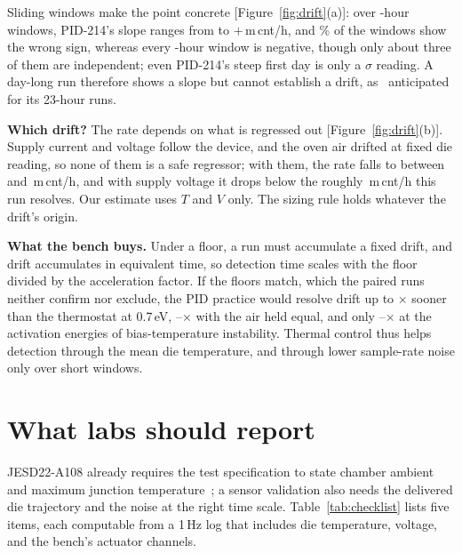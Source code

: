 \documentclass[10pt,twocolumn]{article}
\newcommand{\mcnth}{\,m\,cnt/h}
\begin{document}
Sliding windows make the point concrete [Figure~\ref{fig:drift}(a)]: over \vWinLenMid-hour windows, PID-214's slope ranges from \vWinMinMid{} to $+$\vWinMaxMid\mcnth, and \vWinPosMid\% of the windows show the wrong sign, whereas every \vWinLenLong-hour window is negative, though only about three of them are independent; even PID-214's steep first day is only a \vEarlyZemp$\sigma$ reading. A day-long run therefore shows a slope but cannot establish a drift, as~\cite{sbcci26} anticipated for its 23-hour runs.

\textbf{Which drift?} The rate depends on what is regressed out [Figure~\ref{fig:drift}(b)]. Supply current and voltage follow the device, and the oven air drifted at fixed die reading, so none of them is a safe regressor; with them, the rate falls to between \vBetaTVOP{} and \vBetaTVI\mcnth, and with supply voltage it drops below the roughly \vMinResolvable\mcnth{} this run resolves. Our estimate uses $T$ and $V$ only. The sizing rule holds whatever the drift's origin.

\textbf{What the bench buys.} Under a floor, a run must accumulate a fixed drift, and drift accumulates in equivalent time, so detection time scales with the floor divided by the acceleration factor. If the floors match, which the paired runs neither confirm nor exclude, the PID practice would resolve drift up to \vAFratio$\times$ sooner than the thermostat at 0.7\,eV, \vAFratioGainLo--\vAFratioGainHi$\times$ with the air held equal, and only \vAFratioEaLo--\vAFratioEaHi$\times$ at the activation energies of bias-temperature instability. Thermal control thus helps detection through the mean die temperature, and through lower sample-rate noise only over short windows.

\section{What labs should report}

JESD22-A108 already requires the test specification to state chamber ambient and maximum junction temperature~\cite{jedec}; a sensor validation also needs the delivered die trajectory and the noise at the right time scale. Table~\ref{tab:checklist} lists five items, each computable from a 1\,Hz log that includes die temperature, voltage, and the bench's actuator channels.
\end{document}
